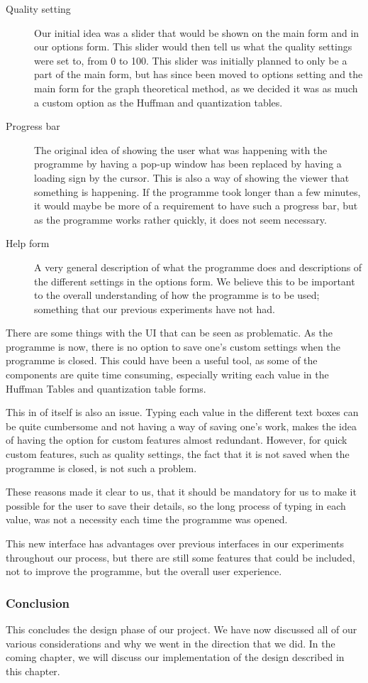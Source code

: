 \begin{description}
\item[Quality setting]
Our initial idea was a slider that would be shown on the main form and in our options form.
This slider would then tell us what the quality settings were set to, from 0 to 100.
This slider was initially planned to only be a part of the main form, but has since been moved to options setting and the main form for the graph theoretical method, as we decided it was as much a custom option as the Huffman and quantization tables.

\item[Progress bar]
The original idea of showing the user what was happening with the programme by having a pop-up window has been replaced by having a loading sign by the cursor.
This is also a way of showing the viewer that something is happening.
If the programme took longer than a few minutes, it would maybe be more of a requirement to have such a progress bar, but as the programme works rather quickly, it does not seem necessary.

\item[Help form]
A very general description of what the programme does and descriptions of the different settings in the options form.
We believe this to be important to the overall understanding of how the programme is to be used; something that our previous experiments have not had.
\end{description}

There are some things with the UI that can be seen as problematic.
As the programme is now, there is no option to save one's custom settings when the programme is closed.
This could have been a useful tool, as some of the components are quite time consuming, especially writing each value in the Huffman Tables and quantization table forms.

This in of itself is also an issue.
Typing each value in the different text boxes can be quite cumbersome and not having a way of saving one's work, makes the idea of having the option for custom features almost redundant.
However, for quick custom features, such as quality settings, the fact that it is not saved when the programme is closed, is not such a problem.

These reasons made it clear to us, that it should be mandatory for us to make it possible for the user to save their details, so the long process of typing in each value, was not a necessity each time the programme was opened.

This new interface has advantages over previous interfaces in our experiments throughout our process, but there are still some features that could be included, not to improve the programme, but the overall user experience.

\subsubsection*{Conclusion}
This concludes the design phase of our project. We have now discussed all of our various considerations and why we went in the direction that we did. In the coming chapter, we will discuss our implementation of the design described in this chapter.


